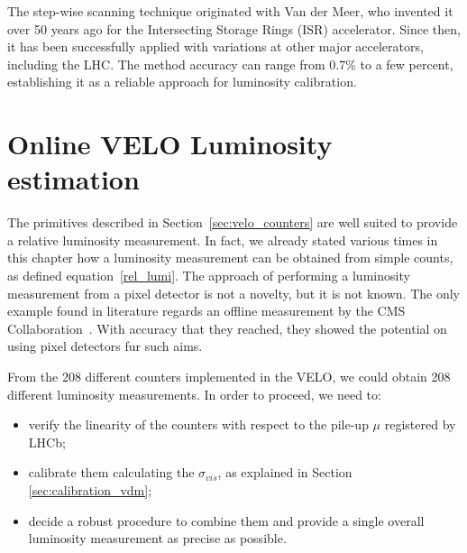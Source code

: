 The step-wise scanning technique originated with Van der Meer, who invented it over 50 years ago for the Intersecting Storage Rings (ISR) accelerator\cite{Carboni:156499}. Since then, it has been successfully applied with variations at other major accelerators\cite{Rubbia:1025746}, including the LHC. The method accuracy can range from 0.7\% to a few percent, establishing it as a reliable approach for luminosity calibration.


\section{Online VELO Luminosity estimation}\label{lumi_measure}
The primitives described in Section~\ref{sec:velo_counters} are well suited to provide a relative luminosity measurement. In fact, we already stated various times in this chapter how a luminosity measurement can be obtained from simple counts, as defined equation~\eqref{rel_lumi}. The approach of performing a luminosity measurement from a pixel detector is not a novelty, but it is not known. The only example found in literature regards an offline measurement by the CMS Collaboration~\cite{CMS-PAS-LUM-13-001}. With accuracy that they reached, they showed the potential on using pixel detectors fur such aims. 

From the 208 different counters implemented in the VELO, we could obtain 208 different luminosity measurements. 
In order to proceed, we need to:
\begin{itemize}
    \item verify the linearity of the counters with respect to the pile-up $\mu$ registered by LHCb;
    \item calibrate them calculating the $\sigma_{vis}$, as explained in Section \ref{sec:calibration_vdm};
    \item decide a robust procedure to combine them and provide a single overall luminosity measurement as precise as possible.
\end{itemize}


